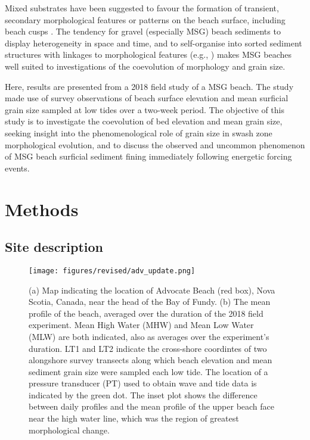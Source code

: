 \documentclass[jmse,article,submit,pdftex,moreauthors]{Definitions/mdpi}
\begin{document}
Mixed substrates have been suggested to favour the formation of transient, secondary morphological features or patterns on the beach surface, including beach cusps \citep{LonguetHiggins_Parkin1962, Guest_Hay2019}. The tendency for gravel (especially MSG) beach sediments to display heterogeneity in space and time, and to self-organise into sorted sediment structures with linkages to morphological features (e.g., \citep{Sherman_etal1993, Austin_Buscombe2008}) makes MSG beaches well suited to investigations of the coevolution of morphology and grain size. 


Here, results are presented from a 2018 field study of a MSG beach. The study made use of survey observations of beach surface elevation and mean surficial grain size sampled at low tides over a two-week period. The objective of this study is to investigate the coevolution of bed elevation and mean grain size, seeking insight into the phenomenological role of grain size in swash zone morphological evolution, and to discuss the observed and uncommon phenomenon of MSG beach surficial sediment fining immediately following energetic forcing events. %




\section{Methods}\label{Methods}

\subsection{Site description}\label{Site}

\begin{figure}[tbp] %
	\texttt{[image: figures/revised/adv\_update.png]}
	\caption{(a) Map indicating the location of Advocate Beach (red box), Nova Scotia, Canada, near the head of the Bay of Fundy. (b) The mean profile of the beach, averaged over the duration of the 2018 field experiment. Mean High Water (MHW) and Mean Low Water (MLW) are both indicated, also as averages over the experiment's duration. LT1 and LT2 indicate the cross-shore coordintes of two alongshore survey transects along which beach elevation and mean sediment grain size were sampled each low tide. The location of a pressure transducer (PT) used to obtain wave and tide data is indicated by the green dot. The inset	plot shows the difference between daily profiles and the mean profile of the upper beach face near the high water line, which was the region of greatest morphological change. \label{fig:Adv}}
\end{figure}
\end{document}
